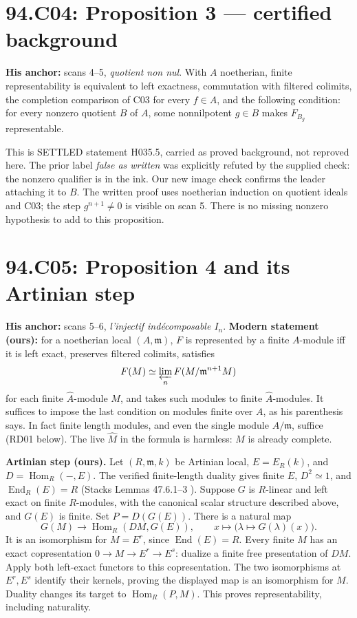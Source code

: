 \documentclass[11pt]{article}
\newcommand{\Hom}{\operatorname{Hom}}
\newcommand{\m}{\mathfrak m}
\begin{document}
\section{94.C04: Proposition 3 --- certified background}
\label{C04}
\textbf{His anchor:} scans 4--5, \emph{quotient non nul}.
With $A$ noetherian, finite representability is equivalent to
left exactness, commutation with filtered colimits, the completion
comparison of C03 for every $f\in A$, and the following condition:
for every nonzero quotient $B$ of $A$, some nonnilpotent $g\in B$
makes $F_{B_g}$ representable.

This is SETTLED statement H035.5, carried as proved background, not
reproved here. The prior label \emph{false as written} was explicitly
refuted by the supplied check: the nonzero qualifier is in the ink.
Our new image check confirms the leader attaching it to $B$.
The written proof uses noetherian induction on quotient ideals and
C03; the step $g^{n+1}\ne0$ is visible on scan 5.
There is no missing nonzero hypothesis to add to this proposition.

\section{94.C05: Proposition 4 and its Artinian step}
\label{C05}
\textbf{His anchor:} scans 5--6, \emph{l'injectif indécomposable $I_n$}.
\textbf{Modern statement (ours):} for a noetherian local $(A,\m)$,
$F$ is represented by a finite $A$-module iff it is left exact,
preserves filtered colimits, satisfies
\[
 F(M)\simeq\varprojlim_n F(M/\m^{n+1}M)
\]
for each finite $\widehat A$-module $M$, and takes such modules to finite
$\widehat A$-modules. It suffices to impose the last condition on
modules finite over $A$, as his parenthesis says. In fact finite length
modules, and even the single module $A/\m$, suffice (RD01 below).
The live $\widehat M$ in the formula is harmless: $M$ is already complete.

\textbf{Artinian step (ours).}
Let $(R,\m,k)$ be Artinian local, $E=E_R(k)$, and
$D=\Hom_R(-,E)$. The verified finite-length duality gives finite $E$,
$D^2\simeq1$, and $\operatorname{End}_R(E)=R$
(Stacks Lemmas 47.6.1--3 \cite{StacksArtinDuality}).
Suppose $G$ is $R$-linear and left exact on finite $R$-modules, with
the canonical scalar structure described above, and $G(E)$ is
finite. Set $P=D(G(E))$. There is a natural map
\[
 G(M)\longrightarrow\Hom_R(DM,G(E)),\qquad
 x\longmapsto\bigl(\lambda\mapsto G(\lambda)(x)\bigr).
\]
It is an isomorphism for $M=E^r$, since $\operatorname{End}(E)=R$.
Every finite $M$ has an exact copresentation
$0\to M\to E^r\to E^s$: dualize a finite free presentation of $DM$.
Apply both left-exact functors to this copresentation. The two
isomorphisms at $E^r,E^s$ identify their kernels, proving the displayed
map is an isomorphism for $M$. Duality changes its target to
$\Hom_R(P,M)$. This proves representability, including naturality.
\end{document}

